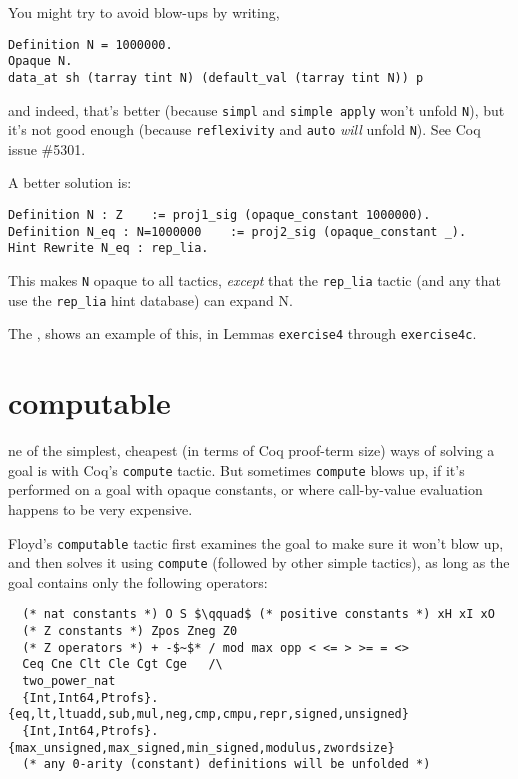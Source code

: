 \documentclass[12pt,fleqn,openany,oneside,showtrims]{memoir}
\newcommand{\ychapter}[2]{\chapter[#1]{#1}}
\begin{document}
You might try to avoid blow-ups by writing,
\begin{lstlisting}
Definition N = 1000000.
Opaque N.
data_at sh (tarray tint N) (default_val (tarray tint N)) p
\end{lstlisting}
\vspace{-2ex}
and indeed, that's better (because \lstinline{simpl} and
\lstinline{simple apply} won't unfold \lstinline{N}),
but it's not good enough (because \lstinline{reflexivity}
and \lstinline{auto} \emph{will} unfold \lstinline{N}).
See Coq issue \#5301.

A better solution is:

\begin{lstlisting}
Definition N : Z    := proj1_sig (opaque_constant 1000000).
Definition N_eq : N=1000000    := proj2_sig (opaque_constant _).
Hint Rewrite N_eq : rep_lia.
\end{lstlisting}

This makes \lstinline{N} opaque to all tactics, \emph{except} that the
\lstinline{rep_lia} tactic (and any that use the
\lstinline{rep_lia} hint database) can expand N.

The , shows an example of this, in Lemmas
\lstinline{exercise4} through \lstinline{exercise4c}.

\ychapter{\upshape\textsf{computable}}

One of the simplest, cheapest (in terms of Coq proof-term size) ways of solving a goal is with Coq's \lstinline{compute} tactic.  But sometimes \lstinline{compute} blows up, if it's performed on a goal with opaque constants, or where
call-by-value evaluation happens to be very expensive.

Floyd's \lstinline{computable} tactic first examines the goal to make sure it won't blow up, and then solves it using \lstinline{compute} (followed by other simple tactics), as long as the goal contains only the following operators:

\begin{lstlisting}
  (* nat constants *) O S $\qquad$ (* positive constants *) xH xI xO
  (* Z constants *) Zpos Zneg Z0
  (* Z operators *) + -$~$* / mod max opp < <= > >= = <>
  Ceq Cne Clt Cle Cgt Cge   /\
  two_power_nat 
  {Int,Int64,Ptrofs}.{eq,lt,ltuadd,sub,mul,neg,cmp,cmpu,repr,signed,unsigned}
  {Int,Int64,Ptrofs}.{max_unsigned,max_signed,min_signed,modulus,zwordsize}
  (* any 0-arity (constant) definitions will be unfolded *)
\end{lstlisting}
\end{document}
